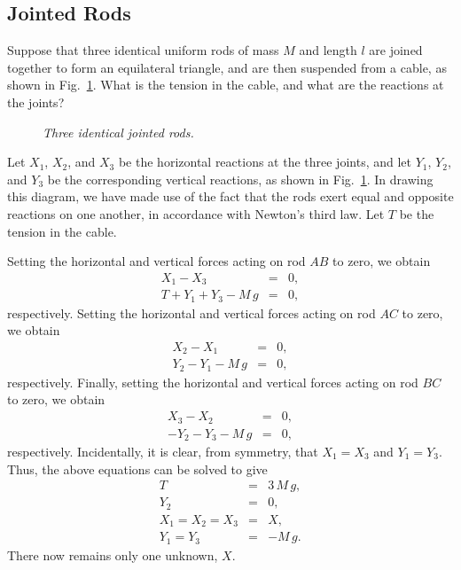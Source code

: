 \subsection{Jointed Rods}
Suppose that three identical uniform rods of mass $M$ and length $l$ are joined together to form
an equilateral triangle, and are then suspended from a cable, as shown in
Fig.~\ref{f95}. What is the tension in the cable, and what 
are the reactions at the joints?

\begin{figure}
\epsfysize=3in
\centerline{}
\caption{\em Three identical jointed rods.}\label{f95}  
\end{figure}

Let $X_1$, $X_2$, and $X_3$ be the horizontal reactions at the three joints, and
let $Y_1$, $Y_2$, and $Y_3$ be the corresponding vertical reactions, as shown in Fig.~\ref{f95}.
In drawing this diagram, we have made use of the fact that the rods exert equal and
opposite reactions on one another, in accordance with Newton's third law. Let $T$
be the tension in the cable.

Setting the horizontal and vertical forces acting on rod $AB$ to zero, we obtain
\begin{eqnarray}
X_1 - X_3 &=& 0,\\[0.5ex]
T + Y_1 + Y_3 - M\,g  &=& 0,
\end{eqnarray}
respectively.
Setting the horizontal and vertical forces acting on rod $AC$ to zero, we obtain
\begin{eqnarray}
 X_2 - X_1 &=& 0,\\[0.5ex]
 Y_2 - Y_1 - M\,g  &=& 0,
\end{eqnarray}
respectively.
Finally, setting the horizontal and vertical forces acting on rod $BC$ to zero, we obtain
\begin{eqnarray}
 X_3 - X_2 &=& 0,\\[0.5ex]
 -Y_2 - Y_3 - M\,g  &=& 0,
\end{eqnarray}
respectively.
Incidentally, it is clear, from symmetry, that $X_1 = X_3$ and $Y_1=Y_3$. Thus, the above equations can
be solved to give
\begin{eqnarray}
T &=& 3\,M\,g,\\[0.5ex]
Y_2 &=& 0,\\[0.5ex]
X_1=X_2=X_3 &=& X,\\[0.5ex]
Y_1=Y_3 &=& -M\,g.
\end{eqnarray}
There now remains only one unknown, $X$.

